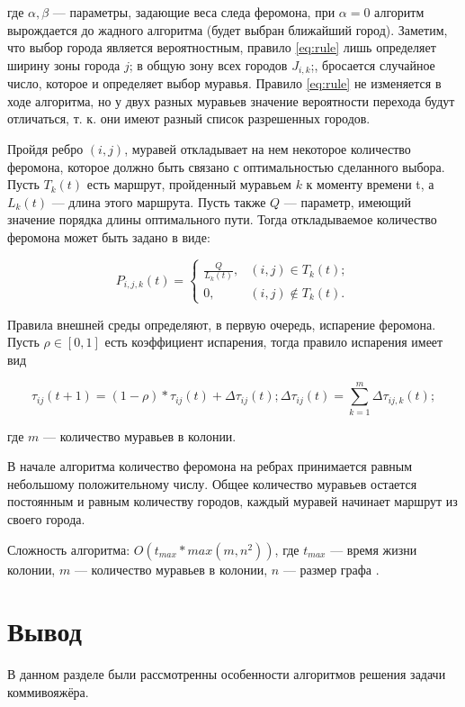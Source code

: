\documentclass[12pt]{report}
\begin{document}
где $\alpha, \beta$ — параметры, задающие веса следа феромона, при $\alpha=0$ алгоритм вырождается до жадного алгоритма (будет выбран ближайший город). Заметим, что
выбор города является вероятностным, правило \ref{eq:rule} лишь определяет ширину
зоны города $j$; в общую зону всех городов $J_{i,k}$;, бросается случайное число, которое и определяет выбор муравья. Правило \ref{eq:rule} не изменяется в ходе алгоритма, но у двух разных муравьев значение вероятности перехода будут отличаться, т. к. они имеют разный список разрешенных городов.

Пройдя ребро $(i,j)$, муравей откладывает на нем некоторое количество феромона, которое должно быть связано с оптимальностью сделанного выбора. Пусть $T_k(t)$ есть маршрут, пройденный муравьем $k$ к моменту времени t, а $L_k(t)$ --- длина этого маршрута. Пусть также $Q$ --- параметр, имеющий значение порядка длины оптимального пути. Тогда откладываемое количество феромона может быть задано в виде:

\begin{equation}
	\label{eq:pheromone_drop}
	P_{i,j,k}(t) =
	\begin{cases}
	\frac{Q}{L_{k}(t)}, & (i,j) \in T_{k}(t);\\
	0, & (i,j) \notin T_{k}(t).
	\end{cases}
\end{equation}

Правила внешней среды определяют, в первую очередь, испарение феромона. Пусть $\rho \in [0,1]$ есть коэффициент испарения, тогда правило испарения имеет вид

\begin{equation}
	\label{eq:pheromone_evaporation}
	\tau_{ij}(t+1) = (1 - \rho) * \tau_{ij}(t) + \Delta\tau_{ij}(t); \Delta\tau_{ij}(t) = \sum_{k = 1}^{m} \Delta\tau_{ij,k}(t); 
	\end{equation}

где $m$ — количество муравьев в колонии.

В начале алгоритма количество феромона на ребрах принимается равным
небольшому положительному числу. Общее количество муравьев остается постоянным и равным количеству городов, каждый муравей начинает маршрут из своего города. 

Сложность алгоритма: $O(t_{max} * max(m, n^2))$, где $t_{max}$ --- время жизни колонии, $m$ --- количество муравьев в колонии, $n$ --- размер графа \cite{ulyanov}.

\section*{Вывод}
В данном разделе были рассмотренны особенности алгоритмов решения задачи коммивояжёра.
	
\end{document}
